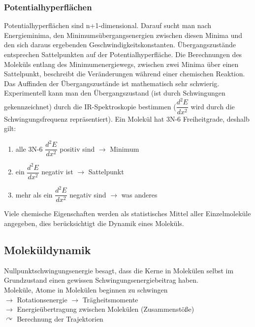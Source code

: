\documentclass[12pt,a4paper,oneside,normalheadings,abstracton,liststotoc,bibtotoc,titlepage,pdftex]{scrartcl}
\begin{document}
\subsubsection{Potentialhyperflächen}
Potentialhyperflächen sind n+1-dimensional. Darauf sucht man nach Energieminima, den Minimumsübergangsenergien zwischen diesen Minima und den sich daraus ergebenden Geschwindigkeitskonstanten. Übergangszustände entsprechen Sattelpunkten auf der Potentialhyperfläche. Die Berechnungen des Moleküls entlang des Minimumenergiewegs, zwischen zwei Minima über einen Sattelpunkt, beschreibt die Veränderungen während einer chemischen Reaktion. Das Auffinden der Übergangszustände ist mathematisch sehr schwierig.\\
Experimentell kann man den Übergangszustand (ist durch Schwingungen gekennzeichnet) durch die IR-Spektroskopie bestimmen ($\dfrac{d^2E}{dx^2}$ wird durch die Schwingungsfrequenz repräsentiert). Ein Molekül hat 3N-6 Freiheitgrade, deshalb gilt:
\begin{enumerate}
\item alle 3N-6 $\dfrac{d^2E}{dx^2}$ positiv sind $\rightarrow$ Minimum
\item ein $\dfrac{d^2E}{dx^2}$ negativ ist $\rightarrow$ Sattelpunkt
\item mehr als ein $\dfrac{d^2E}{dx^2}$ negativ sind $\rightarrow$ was anderes
\end{enumerate}
Viele chemische Eigenschaften werden als statistisches Mittel aller Einzelmoleküle angegeben, dies berücksichtigt die Dynamik eines Moleküls.

\subsection{Moleküldynamik}
Nullpunktschwingungsenergie besagt, dass die Kerne in Molekülen selbst im Grundzustand einen gewissen Schwingungsenergiebeitrag haben.\\
Moleküle, Atome in Molekülen beginnen zu schwingen\\
$\rightarrow$ Rotationsenergie $\rightarrow$ Trägheitsmomente \\
$\rightarrow$ Energieübertragung zwischen Molekülen (Zusammenstöße)\\
$\curvearrowright$ Berechnung der Trajektorien
\end{document}
